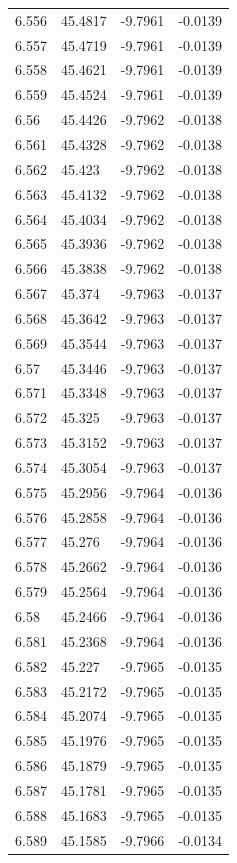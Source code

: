 \begin{tabular}{llll}
6.556 & 45.4817 & -9.7961 & -0.0139 \\
6.557 & 45.4719 & -9.7961 & -0.0139 \\
6.558 & 45.4621 & -9.7961 & -0.0139 \\
6.559 & 45.4524 & -9.7961 & -0.0139 \\
6.56 & 45.4426 & -9.7962 & -0.0138 \\
6.561 & 45.4328 & -9.7962 & -0.0138 \\
6.562 & 45.423 & -9.7962 & -0.0138 \\
6.563 & 45.4132 & -9.7962 & -0.0138 \\
6.564 & 45.4034 & -9.7962 & -0.0138 \\
6.565 & 45.3936 & -9.7962 & -0.0138 \\
6.566 & 45.3838 & -9.7962 & -0.0138 \\
6.567 & 45.374 & -9.7963 & -0.0137 \\
6.568 & 45.3642 & -9.7963 & -0.0137 \\
6.569 & 45.3544 & -9.7963 & -0.0137 \\
6.57 & 45.3446 & -9.7963 & -0.0137 \\
6.571 & 45.3348 & -9.7963 & -0.0137 \\
6.572 & 45.325 & -9.7963 & -0.0137 \\
6.573 & 45.3152 & -9.7963 & -0.0137 \\
6.574 & 45.3054 & -9.7963 & -0.0137 \\
6.575 & 45.2956 & -9.7964 & -0.0136 \\
6.576 & 45.2858 & -9.7964 & -0.0136 \\
6.577 & 45.276 & -9.7964 & -0.0136 \\
6.578 & 45.2662 & -9.7964 & -0.0136 \\
6.579 & 45.2564 & -9.7964 & -0.0136 \\
6.58 & 45.2466 & -9.7964 & -0.0136 \\
6.581 & 45.2368 & -9.7964 & -0.0136 \\
6.582 & 45.227 & -9.7965 & -0.0135 \\
6.583 & 45.2172 & -9.7965 & -0.0135 \\
6.584 & 45.2074 & -9.7965 & -0.0135 \\
6.585 & 45.1976 & -9.7965 & -0.0135 \\
6.586 & 45.1879 & -9.7965 & -0.0135 \\
6.587 & 45.1781 & -9.7965 & -0.0135 \\
6.588 & 45.1683 & -9.7965 & -0.0135 \\
6.589 & 45.1585 & -9.7966 & -0.0134 \\

\end{tabular}
